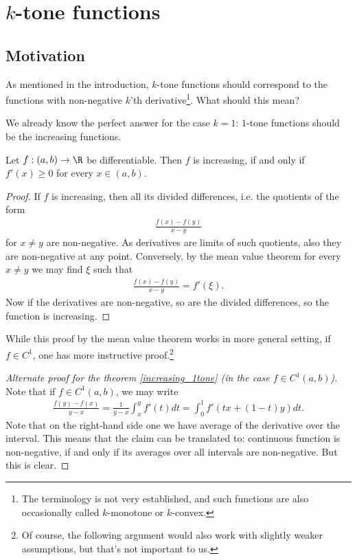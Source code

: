 \chapter{$k$-tone functions}

\section{Motivation}

As mentioned in the introduction, $k$-tone functions should correspond to the functions with non-negative $k$'th derivative\footnote{The terminology is not very established, and such functions are also occasionally called $k$-monotone or $k$-convex.}. What should this mean?

We already know the perfect answer for the case $k = 1$: $1$-tone functions should be the increasing functions.

\begin{lause}\label{increasing_1tone}
	Let $f : (a, b) \to \R$ be differentiable. Then $f$ is increasing, if and only if $f'(x) \geq 0$ for every $x \in (a, b)$.
\end{lause}

\begin{proof}
	If $f$ is increasing, then all its divided differences, i.e. the quotients of the form
	\begin{align*}
		\frac{f(x) - f(y)}{x - y}
	\end{align*}
	for $x \neq y$ are non-negative. As derivatives are limits of such quotients, also they are non-negative at any point. Conversely, by the mean value theorem for every $x \neq y$ we may find $\xi$ such that
	\begin{align*}
		\frac{f(x) - f(y)}{x - y} = f'(\xi).
	\end{align*}
	Now if the derivatives are non-negative, so are the divided differences, so the function is increasing.
\end{proof}

While this proof by the mean value theorem works in more general setting, if $f \in C^{1}$, one has more instructive proof.\footnote{Of course, the following argument would also work with slightly weaker assumptions, but that's not important to us.}

\begin{proof}[Alternate proof for the theorem \ref{increasing_1tone} (in the case $f \in C^{1}(a, b)$)]
	Note that if $f \in C^{1}(a, b)$, we may write
	\begin{align*}
		\frac{f(y) - f(x)}{y - x} = \frac{1}{y - x}\int_{x}^{y} f'(t) dt = \int_{0}^{1} f'(t x + (1 - t) y) dt.
	\end{align*}
	Note that on the right-hand side one we have average of the derivative over the interval. This means that the claim can be translated to: continuous function is non-negative, if and only if its averages over all intervals are non-negative. But this is clear.
\end{proof}

